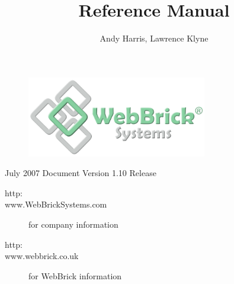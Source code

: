 \documentclass[a4paper,12pt]{article}
\title{\sf{WebBrick Gateway}\linebreak \linebreak Reference Manual}
\author{Andy Harris, Lawrence Klyne}
\begin{document}
\maketitle

\begin{figure}[H]
\centering
\includegraphics[width=0.7\textwidth]{../../Images/WebBrickSystems.png}
\end{figure}


\begin{description}
\item[July 2007 Document Version 1.10 Release]
\end{description}

\begin{description}
\item[http:\\www.WebBrickSystems.com] for company information
\item[http:\\www.webbrick.co.uk] for WebBrick information
\end{description}

\pagebreak

\tableofcontents

\pagebreak




























\end{document}
